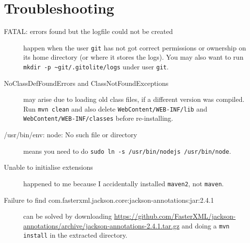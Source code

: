 \documentclass[12pt,a4paper]{article}
\begin{document}
\section{Troubleshooting}
\begin{description}
  \item[FATAL\@: errors found but the logfile could not be created] happen when the user {\tt git} has not got correct permissions or ownership on its home directory (or where it stores the logs).
    You may also want to run {\tt mkdir -p \~{}git/.gitolite/logs} under user {\tt git}.

  \item[NoClassDefFoundError{\rm s and} ClassNotFoundException{\rm s}] may arise due to loading old class files, if a different version was compiled. Run {\tt mvn clean} and also delete {\tt WebContent/WEB-INF/lib} and {\tt WebContent/WEB-INF/classes} before re-installing.
  \item[/usr/bin/env: node: No such file or directory] means you need to do {\tt sudo ln -s /usr/bin/nodejs /usr/bin/node}.

  \item[Unable to initialise extensions] happened to me because I accidentally installed {\tt maven2}, not {\tt maven}.

  \item[Failure to find com.fasterxml.jackson.core:jackson-annotations:jar:2.4.1] can be solved by downloading \url{https://github.com/FasterXML/jackson-annotations/archive/jackson-annotations-2.4.1.tar.gz} and doing a {\tt mvn install} in the extracted directory.

\end{description}
\end{document}
